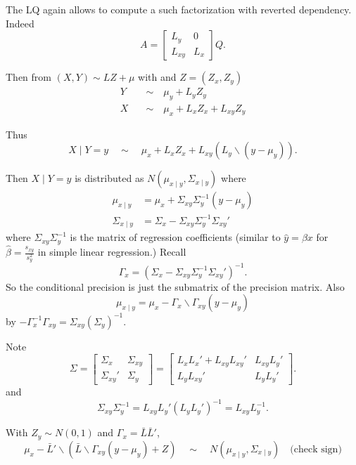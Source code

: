 \documentclass[11pt]{article}
\begin{document}
The LQ again allows to compute a such factorization with reverted dependency. Indeed 
\[
A = \begin{bmatrix}L_{y} & 0 \\  L_{xy} &L_{x} \end{bmatrix}  Q.
\]


 Then from $(X, Y) \sim L Z + \mu$ with and $Z = (Z_x, Z_y)$
\begin{align*}
Y \quad &\sim \quad  \mu_y + L_{y} Z_y\\
X \quad &\sim \quad \mu_x + L_{x} Z_x + L_{xy} Z_y
\end{align*}

Thus
\[
X \mid Y = y \quad \sim \quad \mu_x + L_{x} Z_x + L_{xy} (L_{y}\backslash(y - \mu_y)).
\]


Then $X \mid Y = y$ is distributed as $N(\mu_{x \mid y},\Sigma_{x\mid y})$ where
\begin{align*}
\mu_{x \mid y} &= \mu_x + \Sigma_{xy}\Sigma_{y}^{-1}(y - \mu_y)\\
\Sigma_{x\mid y} &= \Sigma_{x} - \Sigma_{xy}\Sigma_{y}^{-1} \Sigma_{xy}'
\end{align*}
where $\Sigma_{xy}\Sigma_{y}^{-1}$ is the matrix of regression coefficients (similar to $\hat y = \beta x$ for $\hat \beta = \frac{s_{xy}}{s_y^2}$ in simple linear regression.)
Recall 
\[
\Gamma_x = \left(\Sigma_{x} - \Sigma_{xy}\Sigma_{y}^{-1} \Sigma_{xy}'\right)^{-1}.
\]
So the conditional precision is just the submatrix of the precision matrix. Also
\[
\mu_{x \mid y} = \mu_x  -\Gamma_{x}\backslash\Gamma_{xy}(y - \mu_y)
\]%
by $ -\Gamma_{x}^{-1}\Gamma_{xy} =\Sigma_{xy} (\Sigma_y)^{-1}$.


Note \[
 \Sigma =  \begin{bmatrix}\Sigma_{x} & \Sigma_{xy} \\ \Sigma_{xy}' &\Sigma_{y} \end{bmatrix} =  \begin{bmatrix} L_{x}L_{x}' +  L_{xy}L_{xy}'  & L_{xy}L_{y}' \\ L_{y}L_{xy}'  & L_{y}L_{y}' \end{bmatrix}.
\] 
and 
\[
 \Sigma_{xy}\Sigma_{y}^{-1} 
 = L_{xy}L_{y}'(L_{y}L_{y}')^{-1} 
= L_{xy} L_{y}^{-1}.
\]


With $Z_y \sim N(0,1)$ and $\Gamma_x = \bar L\bar L'$, 
\begin{equation}
\mu_x  -\bar L'\backslash\left(\bar L\backslash\Gamma_{xy}(y - \mu_y) + Z\right) \quad\sim \quad N(\mu_{x \mid y},\Sigma_{x\mid y}) \quad \text{(check sign)}
\end{equation}
\end{document}
